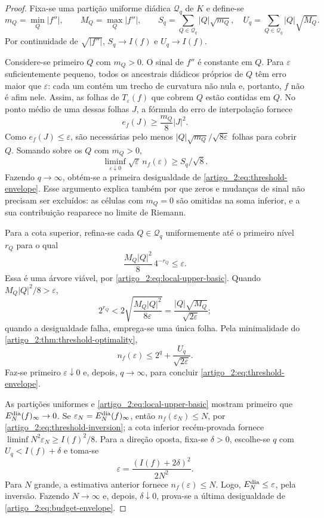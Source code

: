 \begin{proof}
Fixa-se uma partição uniforme diádica $\mathcal Q_q$ de $K$ e define-se
\[
 m_Q=\min_Q|f''|,
 \qquad M_Q=\max_Q|f''|,
 \qquad
 S_q=\sum_{Q\in\mathcal Q_q}|Q|\sqrt{m_Q},
 \quad U_q=\sum_{Q\in\mathcal Q_q}|Q|\sqrt{M_Q}.
\]
Por continuidade de $\sqrt{|f''|}$, $S_q\to I(f)$ e $U_q\to I(f)$.

Considere-se primeiro $Q$ com $m_Q>0$. O sinal de $f''$ é constante em $Q$.
Para $\varepsilon$ suficientemente pequeno, todos os ancestrais diádicos
próprios de $Q$ têm erro maior que $\varepsilon$: cada um contém um trecho
de curvatura não nula e, portanto, $f$ não é afim nele. Assim, as folhas de
$T_\varepsilon(f)$ que cobrem $Q$ estão contidas em $Q$. No ponto médio de
uma dessas folhas $J$, a fórmula do erro de interpolação fornece
\[
 e_f(J)\ge \frac{m_Q}{8}|J|^2.
\]
Como $e_f(J)\le\varepsilon$, são necessárias pelo menos
$|Q|\sqrt{m_Q}/\sqrt{8\varepsilon}$ folhas para cobrir $Q$. Somando sobre os
$Q$ com $m_Q>0$,
\[
 \liminf_{\varepsilon\downarrow0}
 \sqrt\varepsilon\,n_f(\varepsilon)\ge S_q/\sqrt8.
\]
Fazendo $q\to\infty$, obtém-se a primeira desigualdade de
\eqref{artigo_2:eq:threshold-envelope}. Esse argumento explica também por que zeros e
mudanças de sinal não precisam ser excluídos: as células com $m_Q=0$ são
omitidas na soma inferior, e a sua contribuição reaparece no limite de Riemann.

Para a cota superior, refina-se cada $Q\in\mathcal Q_q$ uniformemente até o
primeiro nível $r_Q$ para o qual
\[
 \frac{M_Q|Q|^2}{8}\,4^{-r_Q}\le\varepsilon.
\]
Essa é uma árvore viável, por \eqref{artigo_2:eq:local-upper-basic}. Quando
$M_Q|Q|^2/8>\varepsilon$,
\[
 2^{r_Q}<2\sqrt{\frac{M_Q|Q|^2}{8\varepsilon}}
 =\frac{|Q|\sqrt{M_Q}}{\sqrt{2\varepsilon}};
\]
quando a desigualdade falha, emprega-se uma única folha. Pela minimalidade do
\cref{artigo_2:thm:threshold-optimality},
\[
 n_f(\varepsilon)
 \le 2^q+\frac{U_q}{\sqrt{2\varepsilon}}.
\]
Faz-se primeiro $\varepsilon\downarrow0$ e, depois, $q\to\infty$, para concluir
\eqref{artigo_2:eq:threshold-envelope}.

As partições uniformes e \eqref{artigo_2:eq:local-upper-basic} mostram primeiro que
$E_N^{\rm dia}(f)_\infty\to0$. Se
$\varepsilon_N=E_N^{\rm dia}(f)_\infty$, então
$n_f(\varepsilon_N)\le N$, por \eqref{artigo_2:eq:threshold-inversion}; a cota inferior
recém-provada fornece
$\liminf N^2\varepsilon_N\ge I(f)^2/8$. Para a direção oposta, fixa-se
$\delta>0$, escolhe-se $q$ com $U_q<I(f)+\delta$ e toma-se
\[
 \varepsilon=\frac{(I(f)+2\delta)^2}{2N^2}.
\]
Para $N$ grande, a estimativa anterior fornece
$n_f(\varepsilon)\le N$. Logo, $E_N^{\rm dia}\le\varepsilon$, pela inversão.
Fazendo $N\to\infty$ e, depois, $\delta\downarrow0$, prova-se a última desigualdade
de \eqref{artigo_2:eq:budget-envelope}.
\end{proof}

